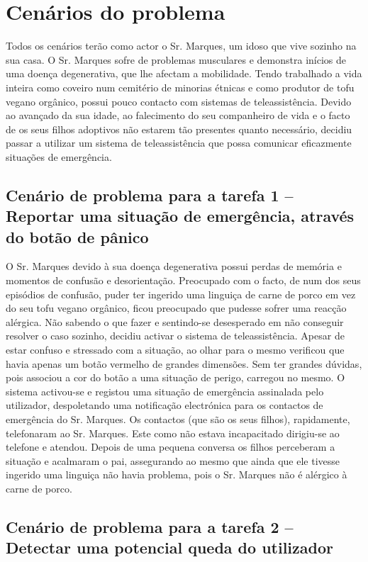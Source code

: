 \section{Cenários do problema}

Todos os cenários terão como actor o Sr. Marques, um idoso que vive sozinho na sua casa. O Sr. Marques sofre de problemas musculares e demonstra inícios de uma doença degenerativa, que lhe afectam a mobilidade. Tendo trabalhado a vida inteira como coveiro num cemitério de minorias étnicas e como produtor de tofu vegano orgânico, possui pouco contacto com sistemas de teleassistência. Devido ao avançado da sua idade, ao falecimento do seu companheiro de vida e o facto de os seus filhos adoptivos não estarem tão presentes quanto necessário, decidiu passar a utilizar um sistema de teleassistência que possa comunicar eficazmente situações de emergência.

\subsection{Cenário de problema para a tarefa 1 – Reportar uma situação de emergência, através do botão de pânico}

O Sr. Marques devido à sua doença degenerativa possui perdas de memória e momentos de confusão e desorientação. Preocupado com o facto, de num dos seus episódios de confusão, puder ter ingerido uma linguiça de carne de porco em vez do seu tofu vegano orgânico, ficou preocupado que pudesse sofrer uma reacção alérgica. Não sabendo o que fazer e sentindo-se desesperado em não conseguir resolver o caso sozinho, decidiu activar o sistema de teleassistência. Apesar de estar confuso e stressado com a situação, ao olhar para o mesmo verificou que havia apenas um botão vermelho de grandes dimensões. Sem ter grandes dúvidas, pois associou a cor do botão a uma situação de perigo, carregou no mesmo.
O sistema activou-se e registou uma situação de emergência assinalada pelo utilizador, despoletando uma notificação electrónica para os contactos de emergência do Sr. Marques.
Os contactos (que são os seus filhos), rapidamente, telefonaram ao Sr. Marques. Este como não estava incapacitado dirigiu-se ao telefone e atendou. Depois de uma pequena conversa os filhos perceberam a situação e acalmaram o pai, assegurando ao mesmo que ainda que ele tivesse ingerido uma linguiça não havia problema, pois o Sr. Marques não é alérgico à carne de porco.


\subsection{Cenário de problema para a tarefa 2 – Detectar uma potencial queda do utilizador}

